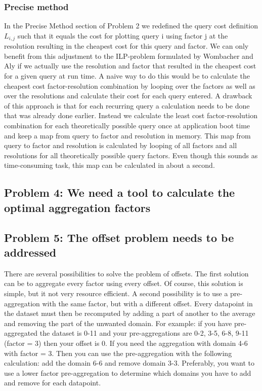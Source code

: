 \subsubsection{Precise method}
In the Precise Method section of Problem 2 we redefined the query cost definition $L_{i,j}$ such that it equals the cost for plotting query i using factor j at the resolution resulting in the cheapest cost for this query and factor. We can only benefit from this adjustment to the ILP-problem formulated by Wombacher and Aly \cite{wombacher2011} if we actually use the resolution and factor that resulted in the cheapest cost for a given query at run time. A naive way to do this would be to calculate the cheapest cost factor-resolution combination by looping over the factors as well as over the resolutions and calculate their cost for each query entered. A drawback of this approach is that for each recurring query a calculation needs to be done that was already done earlier. Instead we calculate the least cost factor-resolution combination for each theoretically possible query once at application boot time and keep a map from query to factor and resolution in memory. This map from query to factor and resolution is calculated by looping of all factors and all resolutions for all theoretically possible query factors. Even though this sounds as time-consuming task, this map can be calculated in about a second.

\subsection{Problem 4: We need a tool to calculate the optimal aggregation factors}
\subsection{Problem 5: The offset problem needs to be addressed}
There are several possibilities to solve the problem of offsets. The first solution can be to aggregate every factor using every offset. Of course, this solution is simple, but it not very resource efficient. A second possibility is to use a pre-aggregation with the same factor, but with a different offset. Every datapoint in the dataset must then be recomputed by adding a part of another to the average and removing the part of the unwanted domain. For example: if you have pre-aggregated the dataset is 0-11 and your pre-aggregations are 0-2, 3-5, 6-8, 9-11 (factor = 3) then your offset is 0. If you need the aggregation with domain 4-6 with factor = 3. Then you can use the pre-aggregation with the following calculation: add the domain 6-6 and remove domain 3-3. Preferably, you want to use a lower factor pre-aggregation to determine which domains you have to add and remove for each datapoint.

